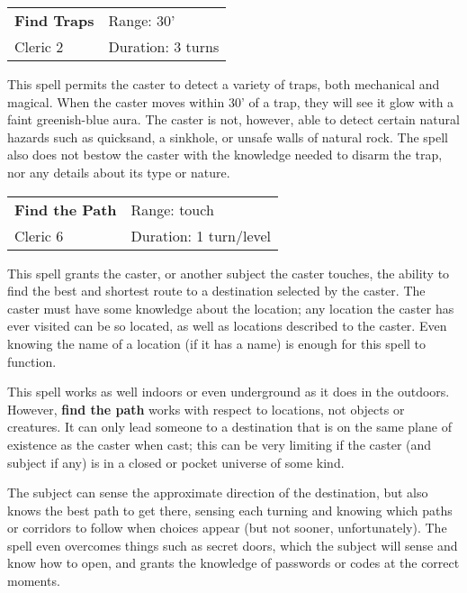 \documentclass[a4paper,twoside,openany,10pt]{book}
\begin{document}
\begin{multicols}{2}
\smallskip\begin{flushleft} 
	\begin{tabularx}{0.45\textwidth}{@{}m{3.5cm}m{5.5cm}@{}} 
		\textbf{Find Traps} & Range: 30'\\
Cleric 2 &Duration: 3 turns\\
	\end{tabularx}\end{flushleft}


This spell permits the caster to detect a variety of traps, both mechanical and magical. When the caster moves within 30' of a trap, they will see it glow with a faint greenish-blue aura. The caster is not, however, able to detect certain natural hazards such as quicksand, a sinkhole, or unsafe walls of natural rock. The spell also does not bestow the caster with the knowledge needed to disarm the trap, nor any details about its type or nature.

\smallskip\begin{flushleft} 
	\begin{tabularx}{0.45\textwidth}{@{}m{3.5cm}m{5.5cm}@{}} 
		\textbf{Find the Path} & Range: touch\\
		Cleric 6 &Duration: 1 turn/level\\
	\end{tabularx}\end{flushleft}

This spell grants the caster, or another subject the caster touches, the ability to find the best and shortest route to a destination selected by the caster. The caster must have some knowledge about the location; any location the caster has ever visited can be so located, as well as locations described to the caster. Even knowing the name of a location (if it has a name) is enough for this spell to function.

This spell works as well indoors or even underground as it does in the outdoors. However, \textbf{find the path} works with respect to locations, not objects or creatures. It can only lead someone to a destination that is on the same plane of existence as the caster when cast; this can be very limiting if the caster (and subject if any) is in a closed or pocket universe of some kind.

The subject can sense the approximate direction of the destination, but also knows the best path to get there, sensing each turning and knowing which paths or corridors to follow when choices appear (but not sooner, unfortunately). The spell even overcomes things such as secret doors, which the subject will sense and know how to open, and grants the knowledge of passwords or codes at the correct moments.


\end{multicols}
\end{document}
